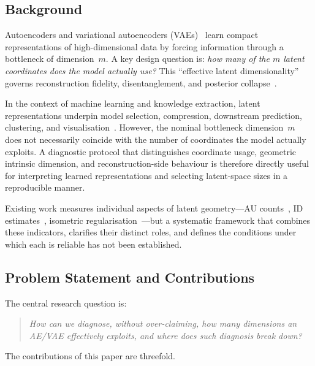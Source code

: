 \documentclass[11pt,a4paper]{article}
\begin{document}
\subsection{Background}\label{sec:intro_bg}

Autoencoders and variational autoencoders (VAEs)~\cite{kingma2014vae} learn
compact representations of high-dimensional data by forcing information through
a bottleneck of dimension~$m$.  A key design question is: \emph{how many of
the $m$ latent coordinates does the model actually use?}  This ``effective
latent dimensionality'' governs reconstruction fidelity, disentanglement, and
posterior collapse~\cite{lucas2019elbo}.

In the context of machine learning and knowledge extraction, latent
representations underpin model selection, compression, downstream prediction,
clustering, and visualisation~\cite{bengio2013representation}.
However, the nominal bottleneck dimension~$m$ does not necessarily coincide
with the number of coordinates the model actually exploits.
A diagnostic protocol that distinguishes coordinate usage, geometric intrinsic
dimension, and reconstruction-side behaviour is therefore directly useful for
interpreting learned representations and selecting latent-space sizes in a
reproducible manner.

Existing work measures individual aspects of latent geometry—AU
counts~\cite{lucas2019elbo,higgins2017betavae}, ID
estimates~\cite{facco2017twonn,levina2005mle}, isometric
regularisation~\cite{kato2020rdae}—but a systematic framework that combines
these indicators, clarifies their distinct roles, and defines the conditions
under which each is reliable has not been established.

\subsection{Problem Statement and Contributions}\label{sec:intro_aim}

The central research question is:
\begin{quote}
\emph{How can we diagnose, without over-claiming, how many dimensions an AE/VAE
effectively exploits, and where does such diagnosis break down?}
\end{quote}

The contributions of this paper are threefold.
\end{document}

